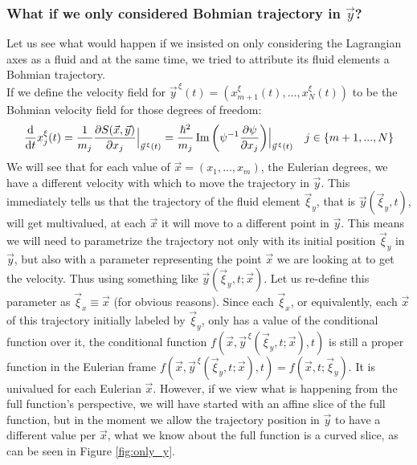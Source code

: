 \documentclass[11pt, a4paper]{article} %
\DeclareRobustCommand{\mybox}[2][gray!10]{%
\begin{tcolorbox}[   %
        left=0.2cm,
        right=0.2cm,
        top=0.15cm,
        bottom=0.15cm,
        colback=#1,
        colframe=#1,
        width=\dimexpr\textwidth\relax, 
        enlarge left by=0mm,
        boxsep=5pt,
        arc=0pt,outer arc=0pt,
        ]
        #2
\end{tcolorbox}
}
\begin{document}
\mybox{
\subsubsection*{What if we only considered Bohmian trajectory in $\vec{y}$?}

Let us see what would happen if we insisted on only considering the Lagrangian axes as a fluid and at the same time, we tried to attribute its fluid elements a Bohmian trajectory.\\

If we define the velocity field for $\vec{y}^{\, \xi}(t)=(x_{m+1}^\xi(t), ...,x_N^\xi(t))$ to be the Bohmian velocity field for those degrees of freedom:
\begin{equation}
\dv{}{t}x_j^\xi(t)=\frac{1}{m_j}\pdv{S(\vec{x}, \vec{y})}{x_j}\Big\rvert_{\vec{y}^{\, \xi}(t)}=\frac{\hbar^2}{m_j}\Im\qty( \psi^{-1} \pdv{\psi}{x_j})\Big\rvert_{\vec{y}^{\, \xi}(t)} \quad j\in\{m+1,...,N\}
\end{equation}
We will see that for each value of $\vec{x}=(x_1,...,x_m)$, the Eulerian degrees, we have a different velocity with which to move the trajectory in $\vec{y}$. This immediately tells us that the trajectory of the fluid element $\vec{\xi}_y$, that is $\vec{y}(\vec{\xi}_y,t)$, will get multivalued, at each $\vec{x}$ it will move to a different point in $\vec{y}$. This means we will need to parametrize the trajectory not only with its initial position $\vec{\xi}_y$ in $\vec{y}$, but also with a parameter representing the point $\vec{x}$ we are looking at to get the velocity. Thus using something like $\vec{y}(\vec{\xi}_y,t; \vec{x})$. Let us re-define this parameter as $\vec{\xi}_x\equiv \vec{x}$ (for obvious reasons). Since each $\vec{\xi}_x$, or equivalently, each $\vec{x}$ of this trajectory initially labeled by $\vec{\xi}_y$, only has a value of the conditional function over it, the conditional function $f(\vec{x},\vec{y}^{\, \xi}(\vec{\xi}_y,t; \vec{x}),t)$ is still a proper function in the Eulerian frame $f(\vec{x},\vec{y}^{\, \xi}(\vec{\xi}_y,t; \vec{x}),t)=f(\vec{x},t; \vec{\xi}_y)$. It is univalued for each Eulerian $\vec{x}$. However, if we view what is happening from the full function's perspective, we will have started with an affine slice of the full function, but in the moment we allow the trajectory position in $\vec{y}$ to have a different value per $\vec{x}$, what we know about the full function is a curved slice, as can be seen in Figure \ref{fig:only_y}.

}
\end{document}
